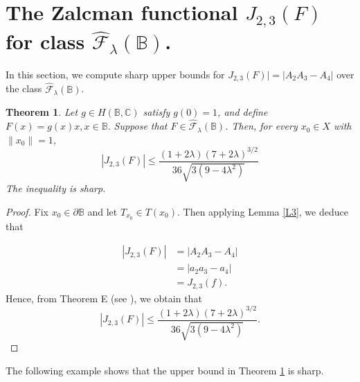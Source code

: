 \documentclass[11pt, reqno]{amsart}
\newtheorem{theo}{Theorem}[section]
\numberwithin{equation}{section}
\begin{document}
\section{{\bf The Zalcman functional $J_{2,3}(F)$ for class $\widehat{\mathcal{F}}_{\lambda}(\mathbb{B})$.}}
In this section, we compute sharp upper bounds for $J_{2,3}(F)|=|A_2A_3-A_4|$
over the class $\widehat{\mathcal{F}}_{\lambda}(\mathbb{B})$.


\begin{theo}\label{J1}
Let $g\in H(\mathbb{B},\mathbb{C})$ satisfy $g(0)=1$, and define $F(x)=g(x)x, x\in\mathbb{B}.$
Suppose that $F\in\widehat{\mathcal{F}}_{\lambda}(\mathbb{B})$. Then, for every
$x_{0}\in X$ with $\|x_{0}\|=1$,
\[
|J_{2,3}(F)|\leq \frac{(1+2\lambda)(7+2\lambda)^{3/2}}{36\sqrt{3(9-4\lambda^2)}}
\]
 The inequality is sharp.
\end{theo}
\begin{proof} Fix $x_0\in \partial{\mathbb{B}}$ and let $T_{x_0}\in T(x_0)$. Then applying Lemma \ref{L3}, we deduce that 

\begin{align*}
|J_{2,3}(F)|
&=|A_2A_3-A_4|\\
&=|a_2a_3-a_4|\\
&=J_{2,3}(f).
\end{align*}
Hence, from Theorem E (see \cite[Theorem 6.1]{ALT2022}), we obtain that
\[
|J_{2,3}(F)|\leq \frac{(1+2\lambda)(7+2\lambda)^{3/2}}{36\sqrt{3(9-4\lambda^2)}}.
\]

\end{proof}

The following example shows that the upper bound in Theorem \ref{J1} is sharp.
\end{document}
